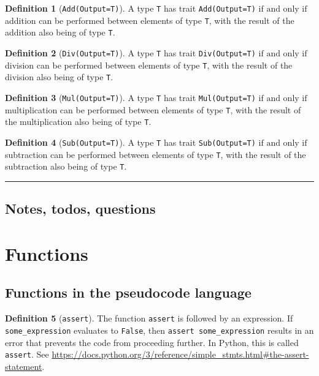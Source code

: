 \documentclass[11pt,a4paper]{article}
\theoremstyle{definition}
\newtheorem{definition}{Definition}[section]
\newcommand{\horizline}{\noindent\rule{\textwidth}{1pt}}
\newcommand{\inPython}[2]{In Python, this is called \texttt{#1}. See \url{#2}.}
\newcommand{\iffText}{\text{if and only if}}
\begin{document}
\begin{definition}[\texttt{Add(Output=T)}]
    A type \texttt{T} has trait \texttt{Add(Output=T)} $\iffText$ addition can be performed between elements of type \texttt{T}, with the result of the addition also being of type \texttt{T}.
\end{definition}

\begin{definition}[\texttt{Div(Output=T)}]
    A type \texttt{T} has trait \texttt{Div(Output=T)} $\iffText$ division can be performed between elements of type \texttt{T}, with the result of the division also being of type \texttt{T}.
\end{definition}

\begin{definition}[\texttt{Mul(Output=T)}]
    A type \texttt{T} has trait \texttt{Mul(Output=T)} $\iffText$ multiplication can be performed between elements of type \texttt{T}, with the result of the multiplication also being of type \texttt{T}.
\end{definition}

\begin{definition}[\texttt{Sub(Output=T)}]
    A type \texttt{T} has trait \texttt{Sub(Output=T)} $\iffText$ subtraction can be performed between elements of type \texttt{T}, with the result of the subtraction also being of type \texttt{T}.
\end{definition}

\horizline

\subsection{Notes, todos, questions}

\section{Functions}

\subsection{Functions in the pseudocode language}

\begin{definition}[\texttt{assert}] 
    The function \texttt{assert} is followed by an expression. If \texttt{some\_expression} evaluates to \texttt{False}, then \texttt{assert some\_expression} results in an error that prevents the code from proceeding further. \inPython{\texttt{assert}}{https://docs.python.org/3/reference/simple_stmts.html\#the-assert-statement}
\end{definition}
\end{document}
